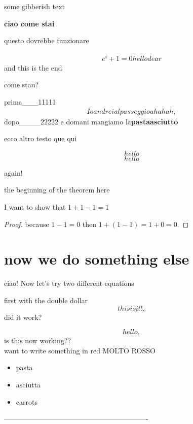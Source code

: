 
some gibberish text

\textbf{ciao come stai}

questo dovrebbe funzionare

\begin{align*}
e^i+1=0 hello dear
\end{align*}
and this is the end

come stau?

prima___11111
\begin{align}
Io andrei al passeggio ahahah,
\end{align}
dopo____22222
e domani mangiamo la\textbf{pastaasciutto}

ecco altro testo que {qui}


\begin{equation} hello \end{equation}
\begin{equation*} hello \end{equation*}

again! \centering

the beginning of the theorem {\Large here}
\begin{theorem}
I want to show that $1+1-1 = 1$
\end{theorem}
\begin{proof}
because $1-1=0$ then $1+(1-1)=1+0=0.$
\end{proof}

\section*{now we do something else}

ciao! Now let's try {\small two different equations}

first with the double dollar
$$
this is it!,
$$
did it work?

\[ hello, \] is this now working?? \\ want to write something in red {\color{red} MOLTO ROSSO }

\begin{itemize}

\item pasta
\item asciutta

\item carrots
\end{itemize}

-------------------------------------------------------------

